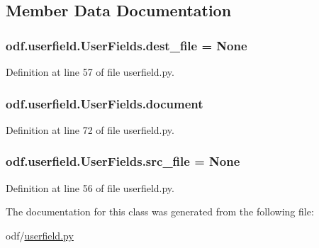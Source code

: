 \subsection{Member Data Documentation}
\hypertarget{classodf_1_1userfield_1_1UserFields_a4ff1ceee3cb418e2b72d6c0366fb63b3}{
\subsubsection[{dest\+\_\+file}]{\setlength{\rightskip}{0pt plus 5cm}odf.\+userfield.\+User\+Fields.\+dest\+\_\+file = None\hspace{0.3cm}{\ttfamily [static]}}}\label{classodf_1_1userfield_1_1UserFields_a4ff1ceee3cb418e2b72d6c0366fb63b3}


Definition at line 57 of file userfield.\+py.

\hypertarget{classodf_1_1userfield_1_1UserFields_adfbbf12e8d9c5377410d463070b5bd76}{
\subsubsection[{document}]{\setlength{\rightskip}{0pt plus 5cm}odf.\+userfield.\+User\+Fields.\+document}}\label{classodf_1_1userfield_1_1UserFields_adfbbf12e8d9c5377410d463070b5bd76}


Definition at line 72 of file userfield.\+py.

\hypertarget{classodf_1_1userfield_1_1UserFields_aab129a38d3cc36d3ca8469de9a04c5a9}{
\subsubsection[{src\+\_\+file}]{\setlength{\rightskip}{0pt plus 5cm}odf.\+userfield.\+User\+Fields.\+src\+\_\+file = None\hspace{0.3cm}{\ttfamily [static]}}}\label{classodf_1_1userfield_1_1UserFields_aab129a38d3cc36d3ca8469de9a04c5a9}


Definition at line 56 of file userfield.\+py.



The documentation for this class was generated from the following file\+:\begin{DoxyCompactItemize}
\item 
odf/\hyperlink{userfield_8py}{userfield.\+py}\end{DoxyCompactItemize}
